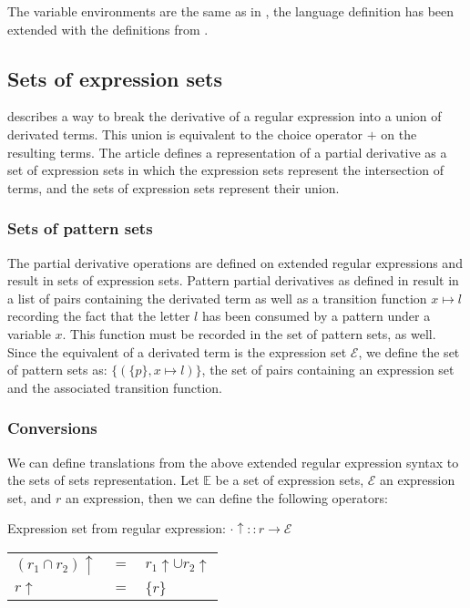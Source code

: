 The variable environments are the same as in \cite{pd-pat}, the language
definition has been extended with the definitions from \cite{pd-ere}.


\subsection{Sets of expression sets}

\cite{pd-ere} describes a way to break the derivative of a regular expression
into a union of derivated terms. This union is equivalent to the choice
operator $+$ on the resulting terms. The article defines a representation of a
partial derivative as a set of expression sets in which the expression sets
represent the intersection of terms, and the sets of expression sets represent
their union.

\subsubsection{Sets of pattern sets}

The partial derivative operations are defined on extended regular expressions
and result in sets of expression sets. Pattern partial derivatives as defined
in \cite{pd-pat} result in a list of pairs containing the derivated term as
well as a transition function $x \mapsto l$ recording the fact that the letter
$l$ has been consumed by a pattern under a variable $x$. This function must be
recorded in the set of pattern sets, as well. Since the equivalent of a
derivated term is the expression set $\mathcal{E}$, we define the set of
pattern sets as: $\{ (\{ p \}, x \mapsto l) \}$, the set of pairs containing
an expression set and the associated transition function.


\subsubsection{Conversions}

We can define translations from the above extended regular expression syntax
to the sets of sets representation. Let $\mathbb{E}$ be a set of expression
sets, $\mathcal{E}$ an expression set, and $r$ an expression, then we can
define the following operators:

Expression set from regular expression: $\cdot\uparrow :: r \to \mathcal{E}$

\begin{tabular}{lll}
   $(r_1 \cap r_2)\uparrow$	& $=$	& $r_1\uparrow \cup r_2\uparrow$	\\
   $r\uparrow$			& $=$	& $\{r\}$				\\
\end{tabular}

